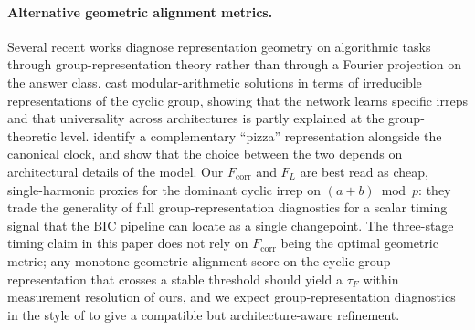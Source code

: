 \documentclass{article}
\newcommand{\tauf}{\tau_{F}}
\newcommand{\fcorr}{F_{\mathrm{corr}}}
\newcommand{\flogit}{F_{L}}
\begin{document}
\paragraph{Alternative geometric alignment metrics.}
Several recent works diagnose representation geometry on
algorithmic tasks through group-representation theory rather than
through a Fourier projection on the answer class.
\citet{chughtai2023toy} cast modular-arithmetic
solutions in terms of irreducible representations of the cyclic
group, showing that the network learns specific irreps and that
universality across architectures is partly explained at the
group-theoretic level.
\citet{zhong2023clock} identify a complementary
``pizza'' representation alongside the canonical clock, and show
that the choice between the two depends on architectural details
of the model.
Our $\fcorr$ and $\flogit$ are best read as cheap, single-harmonic
proxies for the dominant cyclic irrep on $(a+b)\bmod p$: they trade
the generality of full group-representation diagnostics for a
scalar timing signal that the BIC pipeline can locate as a single
changepoint.
The three-stage timing claim in this paper does not rely on
$\fcorr$ being the optimal geometric metric; any monotone
geometric alignment score on the cyclic-group representation that
crosses a stable threshold should yield a $\tauf$ within
measurement resolution of ours, and we expect group-representation
diagnostics in the style of \citet{chughtai2023toy} to give a
compatible but architecture-aware refinement.
\end{document}
